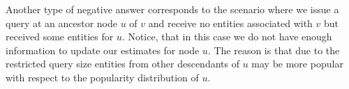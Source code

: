 \documentclass{vldb}
\newcommand{\hierarchy}{\mathcal{H}_D}
\begin{document}
Another type of negative answer corresponds to the scenario where we issue a query at an ancestor node $u$ of $v$ and receive no entities associated with $v$ but received some entities for $u$. Notice, that in this case we do not have enough information to update our estimates for node $u$. The reason is that due to the restricted query size entities from other descendants of $u$ may be more popular with respect to the popularity distribution of $u$.

%
\end{document}
